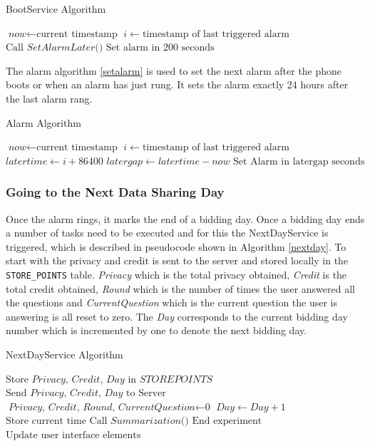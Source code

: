 \begin{algorithm}
\caption{BootService Algorithm}\label{boot}
\begin{algorithmic}[1]
\State $\textit{now} \gets \text{current timestamp}$
\State $i \gets \text{timestamp of last triggered alarm}$
  \State $\text{Call }\textit{SetAlarmLater()}$
\Else
  \State $\text{Set alarm in 200 seconds}$
\EndIf
\EndProcedure
\end{algorithmic}
\end{algorithm}

The alarm algorithm \ref{setalarm} is used to set the next alarm after the phone boots or when an alarm has just rung. It sets the alarm exactly 24 hours after the last alarm rang.

\begin{algorithm}
\caption{Alarm Algorithm}\label{setalarm}
\begin{algorithmic}[1]
\State $\textit{now} \gets \text{current timestamp}$
\State $i \gets \text{timestamp of last triggered alarm}$
\State $\textit{latertime} \gets \textit{i}+\text{86400}$
\State $\textit{latergap} \gets \textit{latertime}-\textit{now}$
\State $\text{Set Alarm in latergap seconds}$
\EndProcedure
\end{algorithmic}
\end{algorithm}

\subsubsection{Going to the Next Data Sharing Day} \label{next}
Once the alarm rings, it marks the end of a bidding day. Once a bidding day ends a number of tasks need to be executed
and for this the NextDayService is triggered, which is described in pseudocode shown in Algorithm \ref{nextday}. To start with the privacy and credit is sent to the server and stored locally in the \texttt{STORE\_POINTS} table. \textit{Privacy} which is the total privacy obtained, \textit{Credit} is the total credit obtained, \textit{Round} which is the number of times the user answered all the questions and \textit{CurrentQuestion} which is the current question the user is answering is all reset to zero. The \textit{Day} corresponds to the current bidding day number which is incremented by one to denote the next bidding day.

\begin{algorithm}
\caption{NextDayService Algorithm}\label{nextday}
\begin{algorithmic}[1]
\State $\text{Store }\textit{Privacy, Credit, Day } \text{in } \textit{STOREPOINTS}$
\State $\text{Send }\textit{Privacy, Credit, Day } \text{to Server}$
\State $\textit{Privacy, Credit, Round, CurrentQuestion} \gets \text{0}$
\State $\textit{Day} \gets \textit{Day}+1$
\State $\text{Store current time}$
\State $\text{Call }\textit{Summarization()}$
  \State $\text{End experiment}$
\Else
  \State $\text{Update user interface elements}$ 
\EndIf
\EndProcedure
\end{algorithmic}
\end{algorithm}

